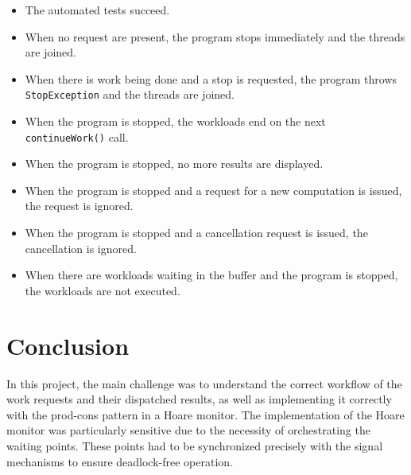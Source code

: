 \documentclass{article}
\begin{document}
    \begin{itemize}
        \item The automated tests succeed.
        \item When no request are present, the program stops immediately and the threads are joined.
        \item When there is work being done and a stop is requested, the program throws \texttt{StopException} and the threads are joined.
        \item When the program is stopped, the workloads end on the next \texttt{continueWork()} call.
        \item When the program is stopped, no more results are displayed.
        \item When the program is stopped and a request for a new computation is issued, the request is ignored.
        \item When the program is stopped and a cancellation request is issued, the cancellation is ignored.
        \item When there are workloads waiting in the buffer and the program is stopped, the workloads are not executed.
    \end{itemize}

    \section*{Conclusion}

    In this project, the main challenge was to understand the correct workflow of the work requests and their dispatched results, as well as implementing it correctly with the prod-cons pattern in a Hoare monitor. The implementation of the Hoare monitor was particularly sensitive due to the necessity of orchestrating the waiting points. These points had to be synchronized precisely with the signal mechanisms to ensure deadlock-free operation.
\end{document}
